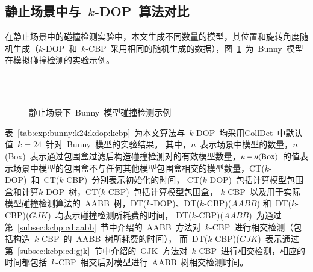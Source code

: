 \subsection{静止场景中与~$k$-DOP~算法对比}
\label{subsec:exper:kdop:kcbp:static}
在静止场景中的碰撞检测实验中，本文生成不同数量的模型，其位置和旋转角度随机生成（$k$-DOP~和~$k$-CBP~采用相同的随机生成的数据），图~\ref{fig:static:cd:bunny}~为~Bunny~模型在模拟碰撞检测的实验示例。

\begin{figure}[htbp]
\centering
{} 
\\ 
\\
\caption{静止场景下~Bunny~模型碰撞检测示例}
\label{fig:static:cd:bunny}
\end{figure}

表~\ref{tab:exp:bunny:k24:kdop:kcbp}~为本文算法与~$k$-DOP~均采用CollDet~中默认值~$k=24$~针对~Bunny~模型的实验结果。
其中，$n$~表示场景中模型的数量，$n$(Box)~表示通过包围盒过滤后构造碰撞检测对的有效模型数量，$n-n(\textnormal{Box})$~的值表示场景中模型的包围盒不与任何其他模型包围盒相交的模型数量，CT($k$-DOP)~和~CT($k$-CBP)~分别表示初始化的时间， CT($k$-DOP)~包括计算模型包围盒和计算$k$-DOP~树，CT($k$-CBP)~包括计算模型包围盒，
$k$-CBP~以及用于实际模型碰撞检测算法的~AABB~树，DT($k$-DOP)、DT($k$-CBP)($AABB$) 和~DT($k$-CBP)($GJK$)~均表示碰撞检测所耗费的时间， 
DT($k$-CBP)($AABB$)~为通过第~\ref{subsec:kcbp:cd:aabb}~节中介绍的~AABB~方法对~$k$-CBP~进行相交检测（包括构造~$k$-CBP~的~AABB~树所耗费的时间），
而~DT($k$-CBP)($GJK$)~表示通过第~\ref{subsec:kcbp:cd:gjk}~节中介绍的~GJK~方法对~$k$-CBP~进行相交检测，相应的时间都包括~$k$-CBP~相交后对模型进行~AABB~树相交检测时间。

